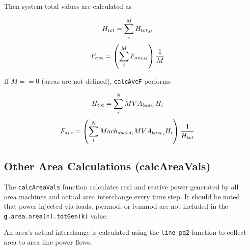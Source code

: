 \noindent Then system total values are calculated as

\begin{equation}{\label{eq: systemH} }
H_{tot} = \sum_{i}^{M} H_{tot_M}
\end{equation} 
\vspace{-1em}
\begin{equation}{\label{eq: systemF} }
F_{ave} = \left( \sum_{i}^{M} F_{ave_M} \right) \dfrac{1}{M}
\end{equation}
\vspace{0.5 em}

\noindent If $M==0$ (areas are not defined), \verb|calcAveF| performs

\begin{equation}{\label{eq: systemH2} }
H_{tot} = \sum_{i}^{N} MVA_{base_i}H_i 
\end{equation} 
\vspace{-1em}
\begin{equation}{\label{eq: systemF2} }
F_{ave} = \left( \sum_{i}^{N}Mach_{speed_i}MVA_{base_i}H_i \right) \dfrac{1}{H_{tot}}
\end{equation}\vspace{0.5 em}


\subsection{Other Area Calculations (calcAreaVals)}  
The \verb|calcAreaVals| function calculates real and reative power generated by all area machines and actual area interchange every time step.
It should be noted that power injected via loads, pwrmod, or ivmmod are not included in the \verb|g.area.area(n).totGen(k)| value.

An area's actual interchange is calculated using the \verb|line_pq2| function to collect area to area line power flows.

